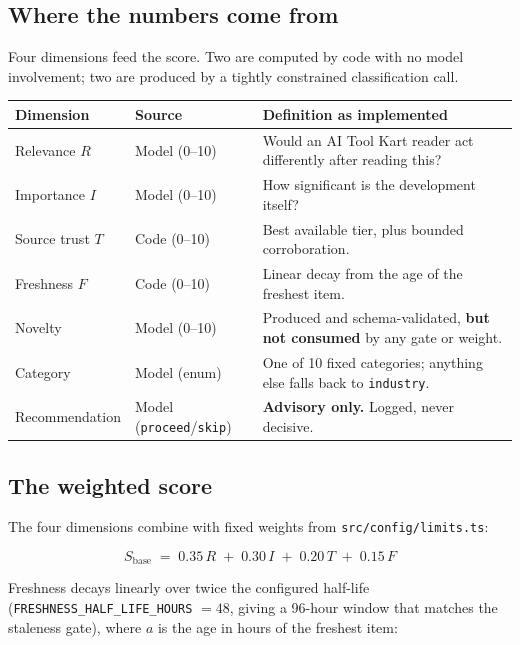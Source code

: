 \documentclass[11pt,a4paper]{article}
\newcommand{\file}[1]{\textcolor{aitkGray}{\texttt{\footnotesize\hyphenpenalty=0\exhyphenpenalty=0\relax #1}}}
\newcommand{\brk}{\hyphenpenalty=0\exhyphenpenalty=0\relax}
\newcommand{\code}[1]{\texttt{\small\brk #1}}
\begin{document}
\subsection{Where the numbers come from}

Four dimensions feed the score. Two are computed by code with no model
involvement; two are produced by a tightly constrained classification call.

\begin{center}
\small
\begin{tabularx}{\textwidth}{@{}l l >{\RaggedRight}X@{}}
\toprule
\textbf{Dimension} & \textbf{Source} & \textbf{Definition as implemented} \\
\midrule
Relevance $R$ & Model (0--10) & Would an AI Tool Kart reader act differently after reading this? \\
Importance $I$ & Model (0--10) & How significant is the development itself? \\
Source trust $T$ & Code (0--10) & Best available tier, plus bounded corroboration. \\
Freshness $F$ & Code (0--10) & Linear decay from the age of the freshest item. \\
Novelty & Model (0--10) & Produced and schema-validated, \textbf{but not consumed} by any gate or weight. \\
Category & Model (enum) & One of 10 fixed categories; anything else falls back to \code{industry}. \\
Recommendation & Model (\code{proceed}/\code{skip}) & \textbf{Advisory only.} Logged, never decisive. \\
\bottomrule
\end{tabularx}
\end{center}

\subsection{The weighted score}

The four dimensions combine with fixed weights from \file{src/config/limits.ts}:

\begin{equation}
S_{\text{base}} \;=\; 0.35\,R \;+\; 0.30\,I \;+\; 0.20\,T \;+\; 0.15\,F
\end{equation}

Freshness decays linearly over twice the configured half-life
(\code{FRESHNESS\_HALF\_LIFE\_HOURS} $=48$, giving a 96-hour window that matches
the staleness gate), where $a$ is the age in hours of the freshest item:
\end{document}
